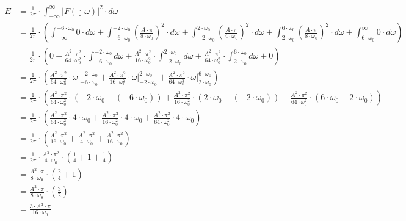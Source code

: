 \begin{task}
\begin{align*}
E &= \frac{1}{2\pi} \cdot \int_{-\infty}^{\infty} \left|F(\jmath \omega)\right|^2 \cdot d\omega\\
&=\frac{1}{2\pi} \cdot \left(\int_{-\infty}^{-6 \cdot \omega_0} 0 \cdot d\omega + \int_{-6 \cdot \omega_0}^{-2 \cdot \omega_0} \left(\frac{A \cdot \pi}{8 \cdot \omega_0}\right)^2 \cdot d\omega + \int_{-2 \cdot \omega_0}^{2 \cdot \omega_0} \left(\frac{A \cdot \pi}{4 \cdot \omega_0}\right)^2 \cdot d\omega + \int_{2 \cdot \omega_0}^{6 \cdot \omega_0} \left(\frac{A \cdot \pi}{8 \cdot \omega_0}\right)^2 \cdot d\omega + \int_{6 \cdot \omega_0}^{\infty} 0 \cdot d\omega\right)\\
&=\frac{1}{2\pi} \cdot \left( 0 + \frac{A^2 \cdot \pi^2}{64 \cdot \omega_0^2} \cdot \int_{-6 \cdot \omega_0}^{-2 \cdot \omega_0} d\omega + \frac{A^2 \cdot \pi^2}{16 \cdot \omega_0^2} \cdot \int_{-2 \cdot \omega_0}^{2 \cdot \omega_0} d\omega + \frac{A^2 \cdot \pi^2}{64 \cdot \omega_0^2} \cdot \int_{2 \cdot \omega_0}^{6 \cdot \omega_0} d\omega + 0\right)\\
&=\frac{1}{2\pi} \cdot \left(\frac{A^2 \cdot \pi^2}{64 \cdot \omega_0^2} \cdot \left.\omega \right|_{-6 \cdot \omega_0}^{-2 \cdot \omega_0} + \frac{A^2 \cdot \pi^2}{16 \cdot \omega_0^2} \cdot \left.\omega \right|_{-2 \cdot \omega_0}^{2 \cdot \omega_0} + \frac{A^2 \cdot \pi^2}{64 \cdot \omega_0^2} \cdot \left.\omega \right|_{2 \cdot \omega_0}^{6 \cdot \omega_0}\right)\\
&=\frac{1}{2\pi} \cdot \left(\frac{A^2 \cdot \pi^2}{64 \cdot \omega_0^2} \cdot (-2 \cdot \omega_0-(-6 \cdot \omega_0)) + \frac{A^2 \cdot \pi^2}{16 \cdot \omega_0^2} \cdot (2 \cdot \omega_0 -(-2 \cdot \omega_0)) + \frac{A^2 \cdot \pi^2}{64 \cdot \omega_0^2} \cdot (6 \cdot \omega_0 - 2 \cdot \omega_0)\right)\\
&=\frac{1}{2\pi} \cdot \left(\frac{A^2 \cdot \pi^2}{64 \cdot \omega_0^2} \cdot 4 \cdot \omega_0 + \frac{A^2 \cdot \pi^2}{16 \cdot \omega_0^2} \cdot 4 \cdot \omega_0  + \frac{A^2 \cdot \pi^2}{64 \cdot \omega_0^2} \cdot 4 \cdot \omega_0\right)\\
&=\frac{1}{2\pi} \cdot \left(\frac{A^2 \cdot \pi^2}{16 \cdot \omega_0} + \frac{A^2 \cdot \pi^2}{4 \cdot \omega_0} + \frac{A^2 \cdot \pi^2}{16 \cdot \omega_0}\right)\\
&=\frac{1}{2\pi} \cdot \frac{A^2 \cdot \pi^2}{4 \cdot \omega_0} \cdot \left(\frac{1}{4} + 1 + \frac{1}{4}\right)\\
&=\frac{A^2 \cdot \pi}{8 \cdot \omega_0} \cdot \left(\frac{2}{4} + 1\right)\\
&=\frac{A^2 \cdot \pi}{8 \cdot \omega_0} \cdot \left(\frac{3}{2}\right)\\
&=\frac{3 \cdot A^2 \cdot \pi}{16 \cdot \omega_0}\\
\end{align*}


\end{task}
